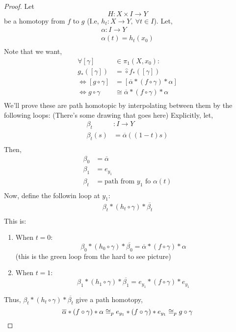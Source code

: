     \begin{proof}
        Let
        \[
            H:X\times I \rightarrow Y
        \]
        be a homotopy from $f$ to $g$ (I.e, $h_t:X \rightarrow Y,\ \forall t\in I$).
        Let,
        \begin{align*}
            \alpha: I \rightarrow Y\\
            \alpha(t)=h_t(x_0)\\
        \end{align*}
        Note that we want,
        \begin{align*}
            \forall [\gamma] &\in \pi_1(X,x_0):\\
            g_*([\gamma])&=\hat\circ f_*([\gamma])\\
            \iff [g\circ \gamma]&=[\overline{\alpha}*(f\circ \gamma)*\alpha]\\
            \iff g\circ \gamma&\cong \overline{\alpha}*(f\circ \gamma)*\alpha\\
        \end{align*}
        We'll prove these are path homotopic by interpolating between them by the following
        loops: (There's some drawing that goes here)
        Explicitly, let,
        \begin{align*}
            \beta_{t}&: I \rightarrow Y\\
            \beta_{t}(s)&=\overline{\alpha}((1-t)s)\\
        \end{align*}
        Then,
        \begin{align*}
            \beta_{0}&=\overline{\alpha}\\
            \beta_{1}&=e_{y_1}\\
            \beta_{t}&=\text{path from $y_1$ fo $\alpha(t)$}\\
        \end{align*}
        Now, define the followin loop at $y_1$:
        \begin{align*}
            \beta_{t}*(h_t\circ \gamma)* \overline{\beta_{t}}\\
        \end{align*}
        This is:
        \begin{enumerate}
            \item When $t=0$:
                \[
                    \beta_{0}*(h_0\circ \gamma)*\overline{\beta_0}
                    =\overline{\alpha}*(f\circ \gamma)*\alpha
                \]
                (this is the green loop from the hard to see picture)
            \item When $t=1$:
                \[
                    \beta_{1}*(h_1\circ \gamma)*\overline{\beta_1}
                    =e_{y_{1}}*(f\circ \gamma)*e_{y_{1}}
                \]
        \end{enumerate}
        Thus, $\beta_{t}*(h_t\circ \gamma)*\overline{\beta_t}$ give a path homotopy,
        \[
                    \overline{\alpha}*(f\circ \gamma)*\alpha
                    \cong_p e_{y_{1}}*(f\circ \gamma)*e_{y_{1}}
                    \cong_p g \circ \gamma\\
        \]
    \end{proof}
